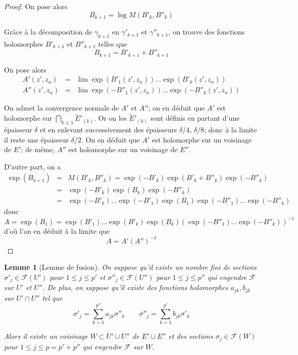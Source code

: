 \documentclass{article}
\newtheorem{lemme}[theoreme]{Lemme}
\theoremstyle{definition}
\theoremstyle{remark}
\begin{document}
\begin{proof}
On pose alors $$B_{k+1}=\log M(B'_k, B''_k)$$

Grâce à la décomposition de $\gamma_{k+1}$ en $\gamma'_{k+1}$ et $\gamma''_{k+1}$, on trouve des fonctions holomorphes $B'_{k+1}$ et $B''_{k+1}$ telles que $$B_{k+1} = B'_{k+1} + B''_{k+1}$$

On pose alors
\begin{eqnarray}
\nonumber A'(z', z_n) &=& \lim \exp(B'_1(z',z_n))...\exp(B'_k(z', z_n)) \\
\nonumber A''(z', z_n) &=& \lim \exp(-B''_1(z',z_n))...\exp(-B''_k(z', z_n))
\end{eqnarray}

On admet la convergence normale de $A'$ et $A''$; on en déduit que $A'$ est holomorphe sur $\bigcap_{k \geq 1} \tilde{E}'_{(k)}$. Or on les $\tilde{E}'_{(k)}$ sont définis en partant d'une épaisseur $\delta$ et en enlevant successivement des épaisseurs $\delta/4$, $\delta/8$; donc à la limite il reste une épaisseur $\delta/2$. On en déduit que $A'$ est holomorphe sur un voisinage de $E'$; de même, $A''$ est holomorphe sur un voisinage de $E''$.

D'autre part, on a
\begin{eqnarray}
\nonumber \exp(B_{k+1}) &=& M(B'_k,B''_k) = \exp(-B'_k)\exp(B'_k+B''_k)\exp(-B''_k) \\
\nonumber &=& \exp(-B'_k)\exp(B_k)\exp(-B''_k) \\
\nonumber &=& \exp(-B'_k)...\exp(-B'_1)\exp(B_1)\exp(-B''_1)...\exp(-B''_k)
\end{eqnarray}
donc $$A = \exp(B_1) = \exp(B'_1)...\exp(B'_k)\exp(B_k)(\exp(-B''_1)...\exp(-B''_k))^{-1}$$
d'où l'on en déduit à la limite que $$A = A' (A'')^{-1}$$
\end{proof}

\begin{lemme}[Lemme de fusion]
On suppose qu'il existe un nombre fini de sections $\sigma'_j \in \mathcal{F}(U')$ pour $1\leq j \leq p'$ et $\sigma''_j \in \mathcal{F}(U'')$ pour $1\leq j \leq p''$ qui engendre $\mathcal{F}$ sur $U'$ et $U''$. De plus, on suppose qu'il existe des fonctions holomorphes $a_{jk}, b_{jk}$ sur $U' \cap U''$ tel que
\begin{equation*}
\sigma'_j = \sum_{k=1}^{p''} a_{jk}\sigma''_k \qquad
\sigma''_j = \sum_{k=1}^{p'} b_{jk}\sigma'_k
\end{equation*}

Alors il existe un voisinage $W \subset U' \cup U''$ de $E' \cup E''$ et des sections $\sigma_j \in \mathcal{F}(W)$ pour $1\leq j \leq p=p'+p''$ qui engendre $\mathcal{F}$ sur $W$.
\end{lemme}
\end{document}
